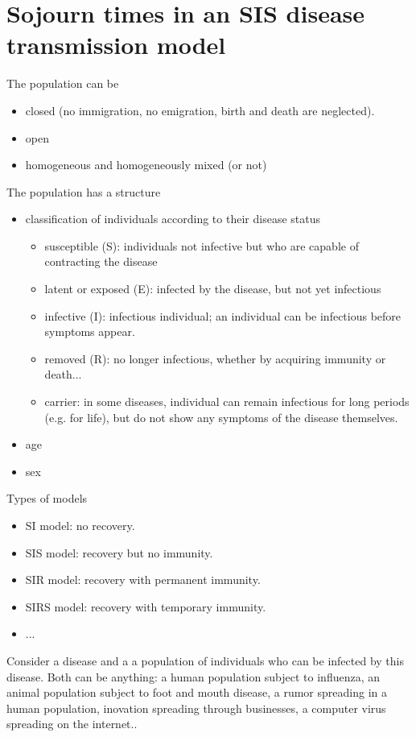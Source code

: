 \section{Sojourn times in an SIS disease transmission model} 
\label{sec:epid_residence_time}
The population can be 
\begin{itemize}
\item closed (no immigration, no emigration, birth and death are neglected). 
\item open
\item homogeneous and homogeneously mixed (or not)
\end{itemize}
The population has a structure
\begin{itemize}
\item classification of individuals according to their disease status
\begin{itemize}
\item susceptible (S): individuals not infective but who are capable of contracting the disease
\item latent or exposed (E): infected by the disease, but not yet infectious
\item infective (I): infectious individual; an individual can be infectious before symptoms appear.
\item removed (R): no longer infectious, whether by acquiring immunity or death...
\item carrier: in some diseases, individual can remain infectious for long periods (e.g. for life), but do not show any symptoms of the disease themselves.
\end{itemize}
\item age
\item sex
\end{itemize}
Types of models
\begin{itemize}
\item SI model: no recovery.
\item SIS model: recovery but no immunity.
\item SIR model: recovery with permanent immunity.
\item SIRS model: recovery with temporary immunity.
\item ...
\end{itemize}




Consider a disease and a a population of individuals who can be infected by this disease.
Both can be anything: a human population subject to influenza, an animal population subject to foot and mouth disease, a rumor spreading in a human population, inovation spreading through businesses,
a computer virus spreading on the internet..

